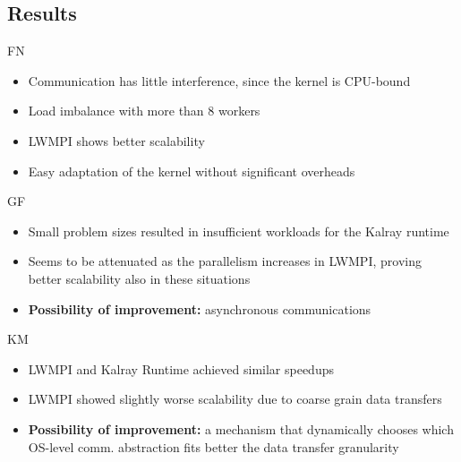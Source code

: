 \documentclass[english,aspectratio=169]{lapesd-slides}
\begin{document}
    \subsection{Results}
      \begin{frame}{FN}

        \begin{itemize}
          \item Communication has little interference, since the kernel is CPU-bound
          \item Load imbalance with more than 8 workers
          \item LWMPI shows better scalability
          \item Easy adaptation of the kernel without significant overheads
        \end{itemize}
      \end{frame}

      \begin{frame}{GF}

        \begin{itemize}
          \item Small problem sizes resulted in insufficient workloads for the Kalray runtime
          \item Seems to be attenuated as the parallelism increases in LWMPI,
          proving better scalability also in these situations
          \item \textbf{Possibility of improvement:} asynchronous communications
        \end{itemize}
      \end{frame}

      \begin{frame}{KM}

        \begin{itemize}
          \item LWMPI and Kalray Runtime achieved similar speedups
          \item LWMPI showed slightly worse scalability due to coarse grain data transfers
          \item \textbf{Possibility of improvement:} a mechanism that dynamically chooses
            which OS-level comm. abstraction fits better the data transfer granularity
        \end{itemize}
      \end{frame}
\end{document}
